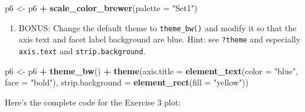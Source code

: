\documentclass[]{book}
\newenvironment{Shaded}{\begin{snugshade}}{\end{snugshade}}
\newcommand{\KeywordTok}[1]{\textcolor[rgb]{0.13,0.29,0.53}{\textbf{#1}}}
\newcommand{\DataTypeTok}[1]{\textcolor[rgb]{0.13,0.29,0.53}{#1}}
\newcommand{\StringTok}[1]{\textcolor[rgb]{0.31,0.60,0.02}{#1}}
\newcommand{\OperatorTok}[1]{\textcolor[rgb]{0.81,0.36,0.00}{\textbf{#1}}}
\newcommand{\NormalTok}[1]{#1}
\providecommand{\tightlist}{%
  \setlength{\itemsep}{0pt}\setlength{\parskip}{0pt}}
\begin{document}
\begin{Shaded}
\begin{Highlighting}[]
\NormalTok{p6 <-}\StringTok{ }\NormalTok{p6 }\OperatorTok{+}\StringTok{ }\KeywordTok{scale_color_brewer}\NormalTok{(}\DataTypeTok{palette =} \StringTok{"Set1"}\NormalTok{)}
\end{Highlighting}
\end{Shaded}

\begin{enumerate}
\def\labelenumi{\arabic{enumi}.}
\setcounter{enumi}{5}
\tightlist
\item
  BONUS: Change the default theme to \texttt{theme\_bw()} and modify it
  so that the axis text and facet label background are blue. Hint: see
  \texttt{?theme} and especially \texttt{axis.text} and
  \texttt{strip.background}.
\end{enumerate}

\begin{Shaded}
\begin{Highlighting}[]
\NormalTok{p6 <-}\StringTok{ }\NormalTok{p6 }\OperatorTok{+}\StringTok{ }\KeywordTok{theme_bw}\NormalTok{() }\OperatorTok{+}
\StringTok{    }\KeywordTok{theme}\NormalTok{(}\DataTypeTok{axis.title =} \KeywordTok{element_text}\NormalTok{(}\DataTypeTok{color =} \StringTok{"blue"}\NormalTok{, }\DataTypeTok{face =} \StringTok{"bold"}\NormalTok{),}
          \DataTypeTok{strip.background =} \KeywordTok{element_rect}\NormalTok{(}\DataTypeTok{fill =} \StringTok{"yellow"}\NormalTok{))}
\end{Highlighting}
\end{Shaded}

Here's the complete code for the Exercise 3 plot:
\end{document}
